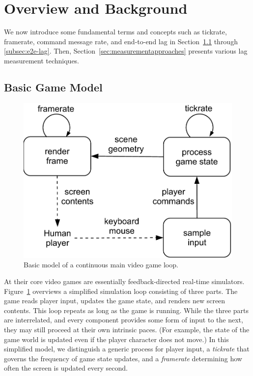 \section{Overview and Background}
\label{sec:background}

We now introduce some fundamental terms and concepts such as tickrate, 
framerate, command message rate, and end-to-end lag 
in Section~\ref{subsec:game-model} through 
\ref{subsec:e2e-lag}. Then, Section~\ref{sec:measurementapproaches} 
presents various lag measurement techniques.


\subsection{Basic Game Model}
\label{subsec:game-model}

\begin{figure}[!t]
\centering
\includegraphics[width=0.8\columnwidth]{../models/game_loop.pdf}
\caption{Basic model of a continuous main video game loop.}
\label{fig:gameloop1}
\end{figure}

At their core video games are essentially feedback-directed 
real-time simulators. Figure~\ref{fig:gameloop1} overviews a 
simplified simulation loop consisting of three parts.
The game reads player input, updates the game state, and renders 
new screen contents. This loop repeats as long as the game is running. 
While the three parts are interrelated, and every component provides 
some form of input to the next, they may still proceed at their own 
intrinsic paces. (For example, the state of the game world is updated 
even if the player character does not move.)
In this simplified model, we distinguish a generic process for player 
input, a \textit{tickrate} that governs the frequency of game state updates, and 
a \textit{framerate} determining how often the screen is updated every second.

